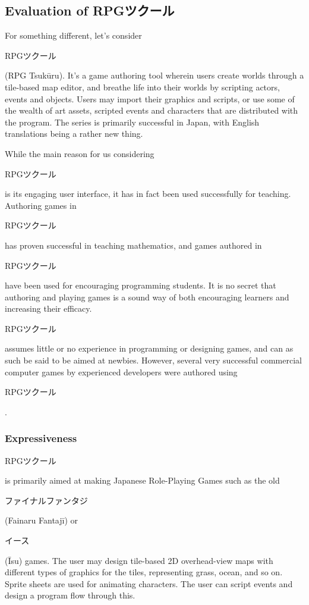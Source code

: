 \begin{CJK}{UTF8}{min}
\subsection{Evaluation of RPGツクール}
\end{CJK}

For something different, let's consider 
\begin{CJK}{UTF8}{min}RPGツクール\end{CJK} (RPG Tsuk\={u}ru). It's a game 
authoring tool wherein users create worlds through a tile-based map editor, 
and breathe life into their worlds by scripting actors, events and objects. 
Users may import their graphics and scripts, or use some of the wealth of art 
assets, scripted events and characters that are distributed with the program. 
The series is primarily successful in Japan, with English translations being a 
rather new thing.

While the main reason for us considering 
\begin{CJK}{UTF8}{min}RPGツクール\end{CJK} is its engaging user interface, it 
has in fact been used successfully for teaching. Authoring games in 
\begin{CJK}{UTF8}{min}RPGツクール\end{CJK} has proven successful in teaching 
mathematics\cite{maltempi2004learning}, and games authored in 
\begin{CJK}{UTF8}{min}RPGツクール\end{CJK} have been used for encouraging 
programming students\cite{Ralph_1the}. It is no secret that authoring and 
playing games is a sound way of both encouraging learners and increasing their 
efficacy.

\begin{CJK}{UTF8}{min}RPGツクール\end{CJK} assumes little or no experience in 
programming or designing games, and can as such be said to be aimed at 
newbies. However, several very successful commercial computer games by 
experienced developers were authored using 
\begin{CJK}{UTF8}{min}RPGツクール\end{CJK}.

\subsubsection{Expressiveness}

\begin{CJK}{UTF8}{min}RPGツクール\end{CJK} is primarily aimed at making 
Japanese Role-Playing Games such as the old 
\begin{CJK}{UTF8}{min}ファイナルファンタジ\end{CJK} (Fainaru Fantaj\={i}) or 
\begin{CJK}{UTF8}{min}イース\end{CJK} (\={I}su) games. The user may design 
tile-based 2D overhead-view maps with different types of graphics for the 
tiles, representing grass, ocean, and so on. Sprite sheets are used for 
animating characters. The user can script events and design a program flow 
through this.

